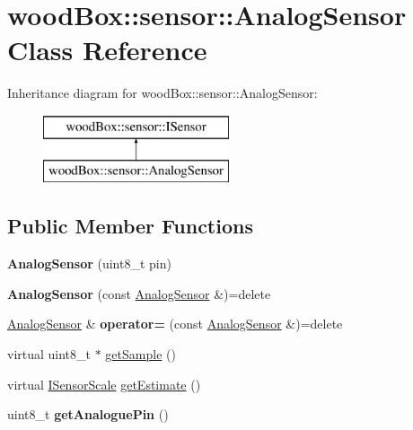 \hypertarget{classwood_box_1_1sensor_1_1_analog_sensor}{}\section{wood\+Box\+:\+:sensor\+:\+:Analog\+Sensor Class Reference}
\label{classwood_box_1_1sensor_1_1_analog_sensor}
Inheritance diagram for wood\+Box\+:\+:sensor\+:\+:Analog\+Sensor\+:\begin{figure}[H]
\begin{center}
\leavevmode
\includegraphics[height=2.000000cm]{classwood_box_1_1sensor_1_1_analog_sensor}
\end{center}
\end{figure}
\subsection*{Public Member Functions}
\begin{DoxyCompactItemize}
\item 
\mbox{\label{classwood_box_1_1sensor_1_1_analog_sensor_a41d8ff91cf91d2bdbccffe8f1316421b}} 
{\bfseries Analog\+Sensor} (uint8\+\_\+t pin)
\item 
\mbox{\label{classwood_box_1_1sensor_1_1_analog_sensor_a8ee0238d3fab4515b5286e67f1f92083}} 
{\bfseries Analog\+Sensor} (const \mbox{\hyperlink{classwood_box_1_1sensor_1_1_analog_sensor}{Analog\+Sensor}} \&)=delete
\item 
\mbox{\label{classwood_box_1_1sensor_1_1_analog_sensor_a66111957aca931c1b1ea219749b03b3c}} 
\mbox{\hyperlink{classwood_box_1_1sensor_1_1_analog_sensor}{Analog\+Sensor}} \& {\bfseries operator=} (const \mbox{\hyperlink{classwood_box_1_1sensor_1_1_analog_sensor}{Analog\+Sensor}} \&)=delete
\item 
virtual uint8\+\_\+t $\ast$ \mbox{\hyperlink{classwood_box_1_1sensor_1_1_analog_sensor_ae78c25d8c01ba9acd03f90f278966189}{get\+Sample}} ()
\item 
virtual \mbox{\hyperlink{classwood_box_1_1sensor_1_1_i_sensor_aa377bda61ed0d4a1d7e1a7bffe459452}{I\+Sensor\+Scale}} \mbox{\hyperlink{classwood_box_1_1sensor_1_1_analog_sensor_a74ddcfe84f3f5b9d7010442f365c4eee}{get\+Estimate}} ()
\item 
\mbox{\label{classwood_box_1_1sensor_1_1_analog_sensor_a5a7c67726db40be3edd48294910b117b}} 
uint8\+\_\+t {\bfseries get\+Analogue\+Pin} ()
\end{DoxyCompactItemize}
